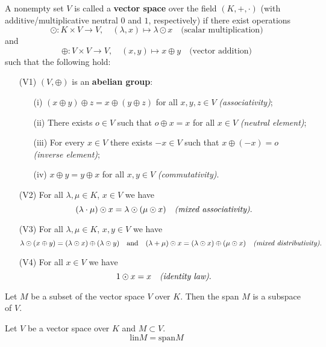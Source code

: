 \documentclass{tufte-handout}
\begin{document}
\begin{Definition}
A nonempty set $V$ is called a \textbf{vector space} over the field $(K, +, \cdot)$ (with additive/multiplicative neutral $0$ and $1$, respectively) if there exist operations
\[
\odot : K \times V \to V, \quad (\lambda, x) \mapsto \lambda \odot x \quad \text{(scalar multiplication)}
\]
and
\[
\oplus : V \times V \to V, \quad (x, y) \mapsto x \oplus y \quad \text{(vector addition)}
\]
such that the following hold:
\begin{itemize}
    \item[(V1)] $(V, \oplus)$ is an \textbf{abelian group}:
    \begin{itemize}
        \item[(i)] $(x \oplus y) \oplus z = x \oplus (y \oplus z)$ for all $x, y, z \in V$ \hfill \textit{(associativity)};
        \item[(ii)] There exists $o \in V$ such that $o \oplus x = x$ for all $x \in V$ \hfill \textit{(neutral element)};
        \item[(iii)] For every $x \in V$ there exists $-x \in V$ such that $x \oplus (-x) = o$ \hfill \textit{(inverse element)};
        \item[(iv)] $x \oplus y = y \oplus x$ for all $x, y \in V$ \hfill \textit{(commutativity)}.
    \end{itemize}
    \item[(V2)] For all $\lambda, \mu \in K$, $x \in V$ we have
    \[
    (\lambda \cdot \mu) \odot x = \lambda \odot (\mu \odot x) \quad \text{\textit{(mixed associativity)}}.
    \]
    \item[(V3)] For all $\lambda, \mu \in K$, $x, y \in V$ we have
    \[
    \lambda \odot (x \oplus y) = (\lambda \odot x) \oplus (\lambda \odot y) \quad \text{and} \quad (\lambda + \mu) \odot x = (\lambda \odot x) \oplus (\mu \odot x) \quad \text{\textit{(mixed distributivity)}}.
    \]
    \item[(V4)] For all $x \in V$ we have
    \[
    1 \odot x = x \quad \text{\textit{(identity law)}}.
    \]
\end{itemize}

\end{Definition}

\begin{Lemma}
    Let \( M \) be a subset of the vector space \( V \) over \( K \).
    Then the span \( M \) is a subspace of \( V \).
\end{Lemma}

\begin{Theorem}[Linear hull = linear span]
    Let \( V \) be a vector space over \( K \) and \( M \subset V  \).
    \[\text{lin} M = \text{span} M\]
\end{Theorem}
\end{document}
